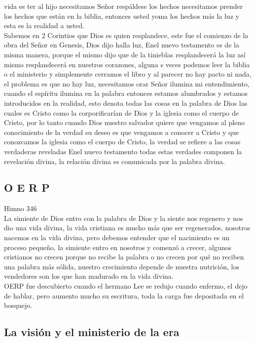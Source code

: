 \documentclass[12pt]{article}
\begin{document}
vida es ter al hijo necesitamos Señor respáldese los hechos necesitamos prender los hechos que están en la biblia, entonces usted yoma los hechos más la luz y esta es la realidad a usted.\\

Sabemos en 2 Corintios que Dios es quien resplandece, este fue el comienzo de la obra del Señor en Genesis, Dios dijo halla luz, Enel nuevo testamento es de la misma manera, porque el mismo dijo que de la tinieblas resplandecerá la luz así mismo resplandecerá en nuestros corazones, alguna s veces podemos leer la biblia o el ministerio y simplemente cerramos el libro y al parecer no hay pacto ni nada, el problema es que no hay luz, necesitamos orar Señor ilumina mi entendimiento, cuando el espíritu ilumina en la palabra entonces estamos alumbrados y estamos introducidos en la realidad, esto denota todas las cosas en la palabra de Dios las cuales es Cristo como la corporificarían de Dios y la iglesia como el cuerpo de Cristo, por lo tanto cuando Dios nuestro salvador quiere que vengamos al pleno conocimiento de la verdad su deseo es que vengamos a conocer a Cristo y que conozcamos la iglesia como el cuerpo de Cristo, la verdad se refiere a las cosas verdaderas reveladas Enel nuevo testamento todas estas verdades componen la revelación divina, la relación divina es comunicada por la palabra divina.

\subsection*{O E R P}

Himno 346\\

La simiente de Dios entro con la palabra de Dios y la siente nos regenero y nos dio una vida divina, la vida cristiana es mucho más que ser regenerados, nosotros nacemos en la vida divina, pero debemos entender que el nacimiento es un proceso pequeño, la simiente entro en nosotros y comenzó a crecer, algunos cristianos no crecen porque no recibe la palabra o no crecen por qué no reciben una palabra más sólida, nuestro crecimiento depende de nuestra nutrición, los vendedores son los que han madurado en la vida divina.\\

OERP fue descubierto cuando el hermano Lee se redujo cuando enfermo, el dejo de hablar, pero aumento mucho su escritura, toda la carga fue depositada en el bosquejo.\\

\subsection*{La visión y el ministerio de la era}
\end{document}
